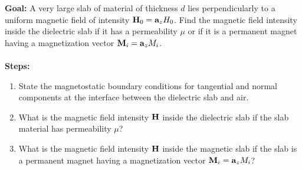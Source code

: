 \documentclass[../../header.tex]{subfiles}
\begin{document}
\textbf{Goal:} A very large slab of material of thickness $d$ lies perpendicularly to a uniform magnetic field of intensity $\mathbf{H}_0 = \mathbf{a}_z H_0$. Find the magnetic field intensity inside the dielectric slab if it has a permeability $\mu$ or if it is a permanent magnet having a magnetization vector $\mathbf{M}_i = \mathbf{a}_z M_i$.\\
\\
\textbf{Steps:} 
\begin{enumerate}
\item State the magnetostatic boundary conditions for tangential and normal components at the interface between the dielectric slab and air.\\

\item What is the magnetic field intensity $\mathbf{H}$ inside the dielectric slab if the slab material has permeability  $\mu$? \\

\item What is the magnetic field intensity $\mathbf{H}$ inside the magnetic slab if the slab is a permanent magnet having a magnetization vector $\mathbf{M}_i = \mathbf{a}_z M_i$? \\

\end{enumerate}
\end{document}
